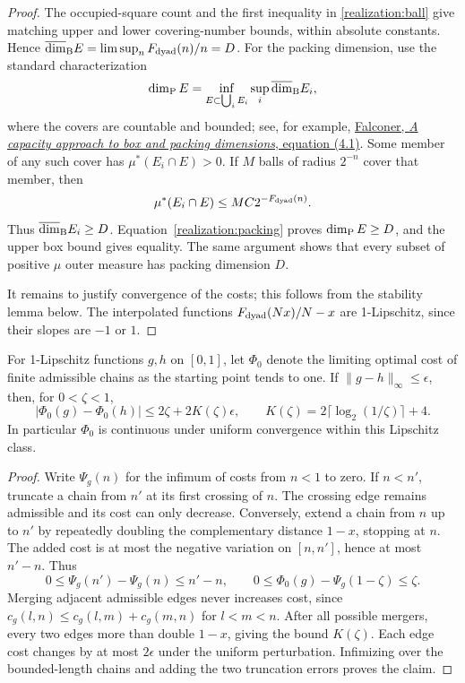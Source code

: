 \begin{proof}
The occupied-square count and the first inequality in
\eqref{realization:ball} give matching upper and lower covering-number
bounds, within absolute constants. Hence
\(\overline{\dim}_{\rm B}E=\limsup_nF_{\rm dyad}(n)/n=D\).
For the packing dimension, use the standard characterization
\begin{equation}\label{realization:packing}
 \dim_{\mathrm P} E=\inf_{E\subset\bigcup_iE_i}
       \sup_i\overline{\dim}_{\rm B}E_i,
\end{equation}
where the covers are countable and bounded; see, for example,
\href{https://research-repository.st-andrews.ac.uk/bitstream/handle/10023/17263/CapacityProjections_Falconer.pdf?sequence=1}
{Falconer, \emph{A capacity approach to box and packing dimensions},
equation (4.1)}.
Some member of any such cover has \(\mu^*(E_i\cap E)>0\).
If \(M\) balls of radius \(2^{-n}\) cover that member, then
\[
 \mu^*(E_i\cap E)\le MC2^{-F_{\rm dyad}(n)}.
\]
Thus \(\overline{\dim}_{\rm B}E_i\ge D\). Equation~\eqref{realization:packing}
proves \(\dim_{\mathrm P} E\ge D\), and the upper box bound gives equality.
The same argument shows that every subset of positive \(\mu\) outer measure
has packing dimension \(D\).

It remains to justify convergence of the costs; this follows from the
stability lemma below. The interpolated functions
\(F_{\rm dyad}(Nx)/N-x\) are 1-Lipschitz, since their slopes are
\(-1\) or \(1\).
\end{proof}

\begin{lemma}\label{realization:stability}
For 1-Lipschitz functions \(g,h\) on \([0,1]\), let \(\Phi_0\) denote
the limiting optimal cost of finite admissible chains as the starting point
tends to one. If \(\|g-h\|_\infty\le\epsilon\), then, for
\(0<\zeta<1\),
\[
 |\Phi_0(g)-\Phi_0(h)|\le2\zeta+2K(\zeta)\epsilon,
 \qquad K(\zeta)=2\lceil\log_2(1/\zeta)\rceil+4.
\]
In particular \(\Phi_0\) is continuous under uniform convergence within
this Lipschitz class.
\end{lemma}
\begin{proof}
Write \(\Psi_g(n)\) for the infimum of costs from \(n<1\) to zero.
If \(n<n'\), truncate a chain from \(n'\) at its first crossing of \(n\).
The crossing edge remains admissible and its cost can only decrease. Conversely,
extend a chain from \(n\) up to \(n'\) by repeatedly doubling the
complementary distance \(1-x\), stopping at \(n\). The added cost is
at most the negative variation on \([n,n']\), hence at most \(n'-n\).
Thus
\[
 0\le\Psi_g(n')-\Psi_g(n)\le n'-n,
 \qquad 0\le\Phi_0(g)-\Psi_g(1-\zeta)\le\zeta.
\]
Merging adjacent admissible edges never increases cost, since
\(c_g(l,n)\le c_g(l,m)+c_g(m,n)\) for \(l<m<n\).
After all possible mergers, every two edges more than double \(1-x\),
giving the bound \(K(\zeta)\). Each edge cost changes by at most
\(2\epsilon\) under the uniform perturbation. Infimizing over the
bounded-length chains and adding the two truncation errors proves the claim.
\end{proof}

